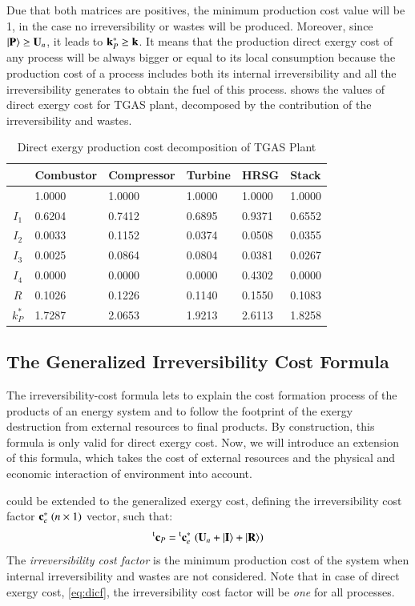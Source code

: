\documentclass{ecos2018}
\begin{document}
Due that both matrices are positives, the minimum production cost value will be 1, in  the case no irreversibility or wastes will be produced. Moreover, since $\left| {\textbf{P} } \right\rangle\ge\mathbf{U}_n$, it leads to $\mathbf{k}_P^*\ge\mathbf{k}$.
It means that the production direct exergy cost of any process will be always bigger or equal to its local consumption because the production cost of a process includes both its internal irreversibility and all the irreversibility generates to obtain the fuel of this process.  shows the values of direct exergy cost for TGAS plant, decomposed by the contribution of the irreversibility and wastes.
\begin{table}[htbp]
	\caption{Direct exergy production cost decomposition of TGAS Plant}
	\begin{tabularx}{0.8\textwidth}{cZZZZZ}
		\addlinespace
		\toprule
		& Combustor & Compressor & Turbine & HRSG  & Stack \\
		\midrule
		& 1.0000 & 1.0000 & 1.0000 & 1.0000 & 1.0000 \\
		\midrule
		$I_1$ & 0.6204 & 0.7412 & 0.6895 & 0.9371 & 0.6552 \\
		$I_2$ & 0.0033 & 0.1152 & 0.0374 & 0.0508 & 0.0355 \\
		$I_3$ & 0.0025 & 0.0864 & 0.0804 & 0.0381 & 0.0267 \\
		$I_4$ & 0.0000 & 0.0000 & 0.0000 & 0.4302 & 0.0000 \\
		$R$   & 0.1026 & 0.1226 & 0.1140 & 0.1550 & 0.1083 \\
		\midrule
		$k_P^*$& 1.7287 & 2.0653 & 1.9213 & 2.6113 & 1.8258 \\
		\bottomrule
	\end{tabularx}
	\label{tab3}
\end{table}

\subsection{The Generalized Irreversibility Cost Formula}
The irreversibility-cost formula lets to explain the cost formation process of the products of an energy system and to follow the footprint of the exergy destruction from external resources to final products. By construction, this formula is only valid for direct exergy cost. Now, we will introduce an extension of this formula, which takes the cost of external resources and the physical and economic interaction of environment into account.

 could be extended to the generalized exergy cost, defining the irreversibility cost factor $\mathbf{c}_{e}^{*}\;(n\times1)$  vector, such that:
\begin{equation}
\prescript{\smash{\mathrm{t}}}{}{\mathbf{c}}_P=\prescript{\smash{\mathrm{t}}}{}{\mathbf{c}}_{e}^{*}\,\left(\mathbf{U}_n+\left| {\textbf{I} } \right\rangle+\left| {\textbf{R} } \right\rangle\right)
\end{equation}
The \emph{irreversibility cost factor} is the minimum production cost of the system when internal irreversibility and wastes are not considered. Note that in case of direct exergy cost, \cref{eq:dicf}, the irreversibility cost factor will be \emph{one} for all processes.
\end{document}
